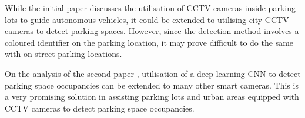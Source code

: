 While the initial paper \citep{cho_automatic_2016} discusses the utilisation of CCTV cameras inside parking lots to guide autonomous vehicles, it could be extended to utilising city CCTV cameras to detect parking spaces. However, since the detection method involves a coloured identifier on the parking location, it may prove difficult to do the same with on-street parking locations.

On the analysis of the second paper \citep{amato_deep_2017}, utilisation of a deep learning \ac{CNN} to detect parking space occupancies can be extended to many other smart cameras. This is a very promising solution in assisting parking lots and urban areas equipped with CCTV cameras to detect parking space occupancies.